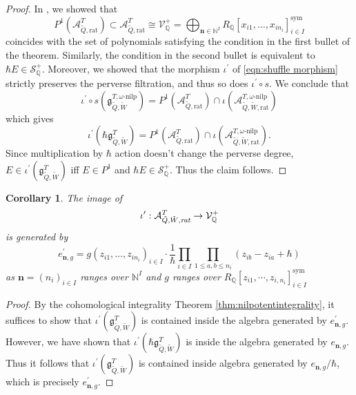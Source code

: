 \documentclass{amsart}
\newtheorem{corollary}[theorem]{Corollary}
\def\fg{{\mathfrak{g}}}
\def\BQ{{\mathbb{Q}}}
\def\CS{{\mathcal{S}}}
\def\CV{{\mathcal{V}}}
\def\sym{\textrm{sym}}
\def\nn{{\mathbb{N}^I}}
\def\bn{{\boldsymbol{n}}}
\def\tQ{\tilde{Q}}
\def\tW{\tilde{W}}
\def\ring{R}
\def\khrate{\mathcal{A}^{T}_{\tQ,\tW,\emph{rat}}}
\def\kharat{\mathcal{A}^{T,\omega\text{-nilp}}_{\tQ,\tW,\text{rat}}}
\def\tbpsw{\mathfrak{g}^{T,\omega\text{-nilp}}_{\tilde{Q},\tilde{W}}}
\def\tbps{\mathfrak{g}^T_{\tilde{Q},\tilde{W}}}
\begin{document}
\begin{proof} In \cite{jindalnegutbps}, we showed that 
$$
P^1(\mathcal{A}^T_{\tilde{Q},\mathrm{rat}}) \subset \mathcal{A}^T_{\tilde{Q},\mathrm{rat}} \cong \CV^+_{\mathbb{Q}} = \bigoplus_{\bn \in \nn} \ring_{\mathbb{Q}}[x_{i1},\dots,x_{in_i}]_{i \in I}^{\sym}
$$
coincides with the set of polynomials satisfying the condition in the first bullet of the theorem. Similarly, the condition in the second bullet is equivalent to $\hbar E \in \CS^+_{\BQ}$. Moreover, we showed that the morphism $\iota^{\prime}$ of \eqref{eqn:shuffle morphism} strictly preserves the perverse filtration, and thus so does $\iota^{\prime} \circ s$. We conclude that 
\[ 
\iota^{\prime}\circ s(\tbpsw) = P^1(\mathcal{A}^T_{\tilde{Q},\mathrm{rat}}) \cap \iota(\kharat) 
\] 
which gives
\[ 
\iota^{\prime}(\hbar \tbps) = P^1(\mathcal{A}^T_{\tilde{Q}, \mathrm{rat}}) \cap \iota(\kharat).
\] 
Since multiplication by $\hbar$ action doesn't change the perverse degree, $E \in \iota^{\prime}(\mathfrak{g}^T_{\tilde{Q},\tilde{W}})$ iff $E \in P^1$ and $\hbar E \in \mathcal{S}^+_{\BQ}$. Thus the claim follows. \end{proof}

\begin{corollary}

The image of \[ \iota^{\prime}: \khrate \rightarrow \mathcal{V}^+_{\mathbb{Q}}\] is generated by 
\begin{equation} \label{eqn:special2}
e_{\bn,g}^{\prime} = g(z_{i1},\dots,z_{in_i})_{i \in I} \cdot \frac 1{\hbar} \prod_{i \in I} \prod_{1 \leq a ,  b \leq n_i} \left(z_{ib}-z_{ia}+\hbar\right)
\end{equation}
as $\bn=(n_i)_{i \in I}$ ranges over $\mathbb{N}^I$ and $g$ ranges over $R_{\mathbb{Q}}[z_{i1},\cdots, z_{i,n_i}]^{\mathrm{sym}}_{i \in I}$
\end{corollary}

\medskip

\begin{proof}
By the cohomological integrality Theorem \ref{thm:nilpotentintegrality}, it suffices to show that $\iota^{\prime}(\tbps)$ is contained inside the algebra generated by $e_{\bn,g}^{\prime}$. However, we have shown that $\iota^{\prime}(\hbar \fg^{T}_{\tilde{Q},\tilde{W}})$ is inside the algebra generated by $e_{\bn,g}$. Thus it follows that $\iota^{\prime}(\fg^{T}_{\tilde{Q},\tilde{W}})$ is contained inside algebra generated by $e_{\bn,g}/\hbar$, which is precisely $e^{\prime}_{\bn,g}$. \end{proof}
\end{document}
